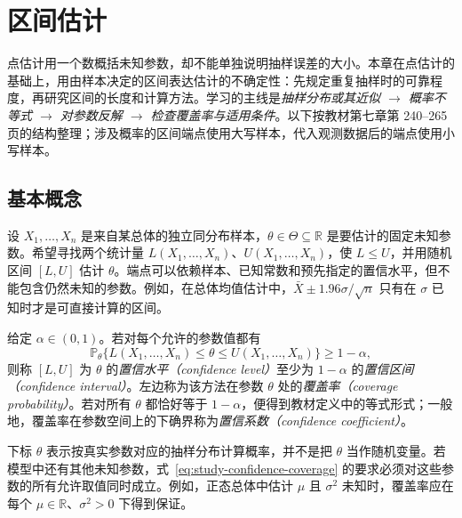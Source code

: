 \setcounter{chapter}{6} %
\chapter{区间估计}
\label{chap:study-interval-estimation}

点估计用一个数概括未知参数，却不能单独说明抽样误差的大小。本章在点估计的基础上，用由样本决定的区间表达估计的不确定性：先规定重复抽样时的可靠程度，再研究区间的长度和计算方法。学习的主线是\emph{抽样分布或其近似 $\longrightarrow$ 概率不等式 $\longrightarrow$ 对参数反解 $\longrightarrow$ 检查覆盖率与适用条件}。以下按教材第七章第 240--265 页的结构整理；涉及概率的区间端点使用大写样本，代入观测数据后的端点使用小写样本。

\section{基本概念}
\label{sec:study-interval-concepts}

设 $X_1,\ldots,X_n$ 是来自某总体的独立同分布样本，$\theta\in\Theta\subseteq\mathbb R$ 是要估计的固定未知参数。希望寻找两个统计量 $L(X_1,\ldots,X_n)$、$U(X_1,\ldots,X_n)$，使 $L\le U$，并用随机区间 $[L,U]$ 估计 $\theta$。端点可以依赖样本、已知常数和预先指定的置信水平，但不能包含仍然未知的参数。例如，在总体均值估计中，$\bar X\pm1.96\sigma/\sqrt n$ 只有在 $\sigma$ 已知时才是可直接计算的区间。

\begin{definition}
\label{def:study-confidence-interval}
给定 $\alpha\in(0,1)$。若对每个允许的参数值都有
\begin{equation}
  \mathbb P_\theta\{L(X_1,\ldots,X_n)\le\theta
                         \le U(X_1,\ldots,X_n)\}\ge1-\alpha,
  \label{eq:study-confidence-coverage}
\end{equation}
则称 $[L,U]$ 为 $\theta$ 的\emph{置信水平（confidence level）}至少为 $1-\alpha$ 的\emph{置信区间（confidence interval）}。左边称为该方法在参数 $\theta$ 处的\emph{覆盖率（coverage probability）}。若对所有 $\theta$ 都恰好等于 $1-\alpha$，便得到教材定义中的等式形式；一般地，覆盖率在参数空间上的下确界称为\emph{置信系数（confidence coefficient）}。
\end{definition}

下标 $\theta$ 表示按真实参数对应的抽样分布计算概率，并不是把 $\theta$ 当作随机变量。若模型中还有其他未知参数，式~\eqref{eq:study-confidence-coverage} 的要求必须对这些参数的所有允许取值同时成立。例如，正态总体中估计 $\mu$ 且 $\sigma^2$ 未知时，覆盖率应在每个 $\mu\in\mathbb R$、$\sigma^2>0$ 下得到保证。

